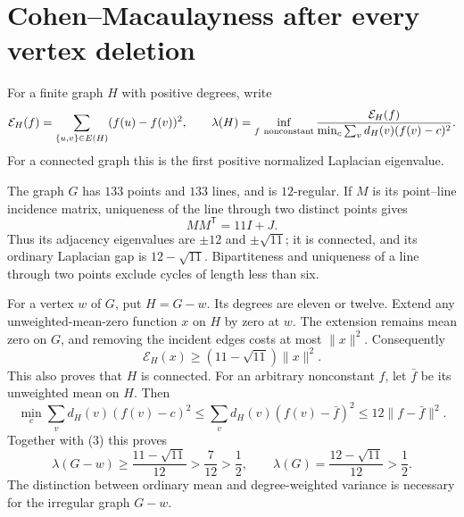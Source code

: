 \documentclass[10pt]{article}
\begin{document}
\section{Cohen--Macaulayness after every vertex deletion}
For a finite graph $H$ with positive degrees, write
\[
 \mathcal E_H(f)=\sum_{\{u,v\}\in E(H)}(f(u)-f(v))^2,
 \qquad
 \lambda(H)=\inf_{f\ {\rm nonconstant}}
 \frac{\mathcal E_H(f)}{\min_c\sum_v d_H(v)(f(v)-c)^2}.
\]
For a connected graph this is the first positive normalized Laplacian
eigenvalue.

The graph $G$ has $133$ points and $133$ lines, and is $12$-regular. If $M$ is its
point--line incidence matrix, uniqueness of the line through two distinct
points gives
\[
                      MM^{\mathsf T}=11I+J.
\]
Thus its adjacency eigenvalues are $\pm12$ and $\pm\sqrt{11}$; it is connected,
and its ordinary Laplacian gap is $12-\sqrt{11}$. Bipartiteness and uniqueness
of a line through two points exclude cycles of length less than six.

For a vertex $w$ of $G$, put $H=G-w$. Its degrees are eleven or twelve.
Extend any unweighted-mean-zero function $x$ on $H$ by zero at $w$.
The extension remains mean zero on $G$, and removing the incident edges costs
at most $\|x\|^2$. Consequently
\[
 \mathcal E_H(x)\geq(11-\sqrt{11})\|x\|^2.              \tag{3}
\]
This also proves that $H$ is connected. For an arbitrary nonconstant $f$, let
$\bar f$ be its unweighted mean on $H$. Then
\[
 \min_c\sum_v d_H(v)(f(v)-c)^2
 \leq \sum_v d_H(v)(f(v)-\bar f)^2
 \leq 12\|f-\bar f\|^2 .
\]
Together with (3) this proves
\[
 \lambda(G-w)\geq\frac{11-\sqrt{11}}{12}>\frac{7}{12}>
 \frac12,\qquad
 \lambda(G)=\frac{12-\sqrt{11}}{12}>\frac12.             \tag{4}
\]
The distinction between ordinary mean and degree-weighted variance is
necessary for the irregular graph $G-w$.
\end{document}
